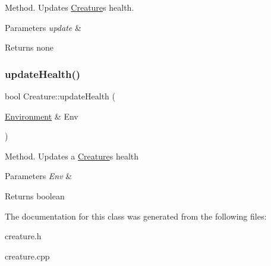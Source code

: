 Method. Updates \hyperlink{class_creature}{Creature}\textquotesingle{}s health. 
\begin{DoxyParams}{Parameters}
{\em update} & \\
\hline
\end{DoxyParams}
\begin{DoxyReturn}{Returns}
none 
\end{DoxyReturn}
\mbox{\label{class_creature_a3316556d75305448ffb28a26d7eaa0ad}} 
\subsubsection{\texorpdfstring{update\+Health()}{updateHealth()}\hspace{0.1cm}{\footnotesize\ttfamily [2/2]}}
{\footnotesize\ttfamily bool Creature\+::update\+Health (\begin{DoxyParamCaption}\item[{\hyperlink{class_environment}{Environment} \&}]{Env }\end{DoxyParamCaption})}

Method. Updates a \hyperlink{class_creature}{Creature}\textquotesingle{}s health 
\begin{DoxyParams}{Parameters}
{\em Env} & \\
\hline
\end{DoxyParams}
\begin{DoxyReturn}{Returns}
boolean 
\end{DoxyReturn}


The documentation for this class was generated from the following files\+:\begin{DoxyCompactItemize}
\item 
creature.\+h\item 
creature.\+cpp\end{DoxyCompactItemize}
